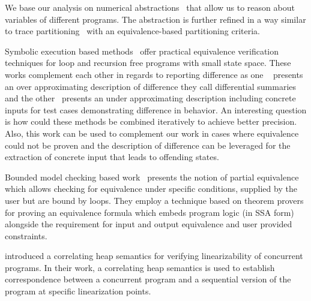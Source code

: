 We base our analysis on numerical abstractions~\cite{CousotHalbwachs78, Mine2006} that allow us to reason about variables of different programs. The abstraction is further refined in a way similar to trace partitioning~\cite{MauborgneRival07} with an equivalence-based partitioning criteria.

Symbolic execution based methods~\cite{DwyerElbaumPerson08, EnglerRamos11} offer practical equivalence verification techniques for loop and recursion free programs with small state space. These works complement each other in regards to reporting difference as one ~\cite{DwyerElbaumPerson08} presents an over approximating description of difference they call differential summaries and the other~\cite{EnglerRamos11} presents an under approximating description including concrete inputs for test cases demonstrating difference in behavior. An interesting question is how could these methods be combined iteratively to achieve better precision. Also, this work can be used to complement our work in cases where equivalence could not be proven and the description of difference can be leveraged for the extraction of concrete input that leads to offending states.

Bounded model checking based work~\cite{GodlinStrichman09} presents the notion of partial equivalence which allows checking for equivalence under specific conditions, supplied by the user but are bound by loops. They employ a technique based on theorem provers for proving an equivalence formula which embeds program logic (in SSA form) alongside the requirement for input and output equivalence and user provided constraints.

\cite{AmitRinetzkyRepsSagivYahav07} introduced a correlating heap semantics for verifying linearizability of concurrent programs. In their work, a correlating heap semantics is used to establish correspondence between a concurrent program and a sequential version of the program at specific linearization points.  
